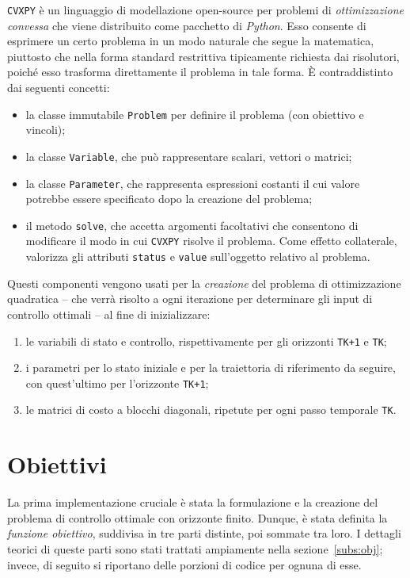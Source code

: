 \verb|CVXPY| è un linguaggio di modellazione open-source per problemi di
\textit{ottimizzazione convessa} che viene distribuito come pacchetto di \textit{Python}.
Esso consente di esprimere un certo problema in un modo naturale che segue la matematica, 
piuttosto che nella forma standard restrittiva tipicamente richiesta dai risolutori,
poiché esso trasforma direttamente il problema in tale forma. 
È contraddistinto dai seguenti concetti:
\begin{itemize}
    \item la classe immutabile \verb|Problem| per definire il problema (con obiettivo e vincoli);
    \item la classe \verb|Variable|, che può rappresentare scalari, vettori o matrici;
    \item la classe \verb|Parameter|, che rappresenta espressioni costanti il cui valore potrebbe essere specificato dopo la creazione del problema;
    \item il metodo \verb|solve|, che accetta argomenti facoltativi che consentono di modificare il modo in cui \verb|CVXPY| risolve il problema. Come effetto collaterale, valorizza gli 
    attributi \verb|status| e \verb|value| sull'oggetto relativo al problema.
\end{itemize}
Questi componenti vengono usati per la \textit{creazione} del problema di ottimizzazione 
quadratica -- che verrà risolto a ogni iterazione per determinare gli input di controllo ottimali -- al fine di inizializzare:
\begin{enumerate}
    \item le variabili di stato e controllo, rispettivamente per gli orizzonti \verb|TK+1| e \verb|TK|;
    \item i parametri per lo stato iniziale e per la traiettoria di riferimento da seguire, con quest'ultimo per l'orizzonte \verb|TK+1|;
    \item le matrici di costo a blocchi diagonali, ripetute per ogni passo temporale \verb|TK|. 
\end{enumerate}

\section{Obiettivi}
\label{subs:impl_obj}
La prima implementazione cruciale è stata la formulazione e la creazione del problema
di controllo ottimale con orizzonte finito. Dunque, è stata definita la \textit{funzione obiettivo}, 
suddivisa in tre parti distinte, poi sommate tra loro. I dettagli teorici di queste parti sono 
stati trattati ampiamente nella sezione~\ref{subs:obj}; invece, di seguito si riportano delle porzioni di codice per ognuna di esse.

